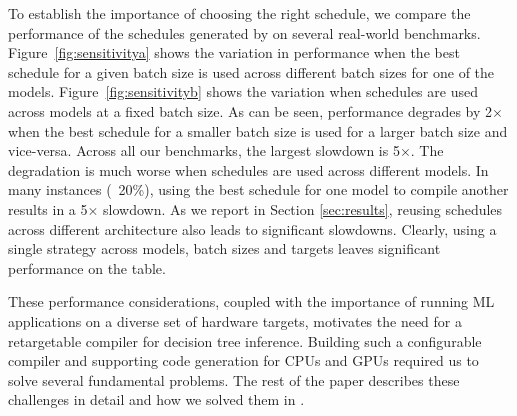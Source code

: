 
To establish the importance of choosing the right schedule, we
compare the performance of the schedules generated by \Treebeard{}
on several real-world benchmarks. 
Figure~\ref{fig:sensitivitya} shows the
variation in performance when the best schedule for a given batch 
size is used across different batch sizes for one of the models. 
Figure~\ref{fig:sensitivityb} shows the variation when schedules 
are used across models at a fixed batch size.
As can be seen, performance degrades by 2$\times$ when the best schedule for a
smaller batch size is used for a larger batch size and vice-versa.
Across all our benchmarks, the largest slowdown is 5$\times$.  %
The degradation is much worse when schedules are used across different models.
In many instances (~20\%), using the best schedule for one model 
to compile another results in a 5$\times$ slowdown.
As we report in Section \ref{sec:results}, reusing schedules across
different architecture also leads to significant slowdowns.
Clearly, using a single strategy across models, batch sizes and targets
leaves significant performance on the table. 

These performance considerations, coupled with 
the importance of running ML applications on a diverse set of hardware targets,
motivates the need for a retargetable compiler for decision tree inference.
Building such a configurable compiler and supporting code generation for CPUs and GPUs 
required us to solve several fundamental problems. 
The rest of the paper describes these challenges in detail and how we
solved them in \Treebeard{}.

